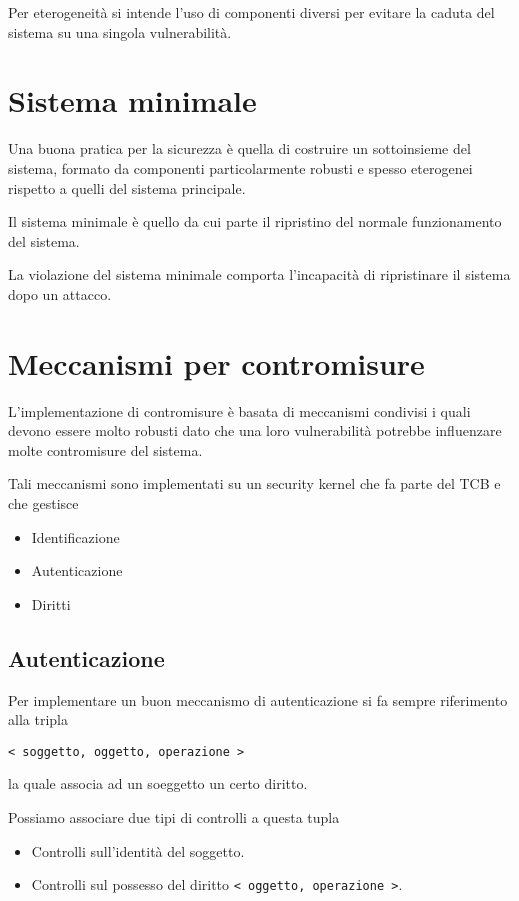 Per eterogeneità si intende l'uso di componenti diversi per evitare la caduta del sistema su una singola vulnerabilità.

\section{Sistema minimale}
Una buona pratica per la sicurezza è quella di costruire un sottoinsieme del sistema, formato da componenti
particolarmente robusti e spesso eterogenei rispetto a quelli del sistema principale.

Il sistema minimale è quello da cui parte il ripristino del normale funzionamento del sistema.

La violazione del sistema minimale comporta l'incapacità di ripristinare il sistema dopo un attacco.

\section{Meccanismi per contromisure}
L'implementazione di contromisure è basata di meccanismi condivisi i quali devono essere molto robusti dato che una
loro vulnerabilità potrebbe influenzare molte contromisure del sistema.

Tali meccanismi sono implementati su un security kernel che fa parte del TCB e che gestisce
\begin{itemize}
	\item Identificazione
	\item Autenticazione
	\item Diritti
\end{itemize}

\subsection{Autenticazione}
Per implementare un buon meccanismo di autenticazione si fa sempre riferimento alla tripla
\begin{center}
	\verb|< soggetto, oggetto, operazione >|
\end{center}
la quale associa ad un soeggetto un certo diritto.

Possiamo associare due tipi di controlli a questa tupla
\begin{itemize}
	\item Controlli sull'identità del soggetto.
	\item Controlli sul possesso del diritto \verb|< oggetto, operazione >|.
\end{itemize}

